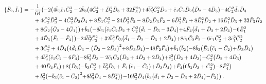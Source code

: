 \documentclass[10pt]{amsart}
\theoremstyle{definition}
\theoremstyle{corollary}
\theoremstyle{remark}
\theoremstyle{conclusion}
\begin{document}
\begin{align}
    \{\bar{F}_2, \bar{I}_1\}&=-\frac{{\rm i}}{64}  \bigl(-2 \bigl(4 \bar{b}_3 \bar{c}_1 \bar{C}_2^3-2 \bar{b}_3 \bigl(4 \bar{C}_2^4+\bar{D}_2^2 \bar{D}_3+32 \bar{F}_3^2\bigl)+4 \bar{b}_3^2 \bar{C}_2^2 \bar{D}_2+\bar{c}_1 \bar{C}_2 \bar{D}_2 \bigl(\bar{D}_2-4 \bar{D}_3\bigl)-4 \bar{C}_2^2 \bar{d}_1 \bar{D}_3\nonumber \\
& \hskip 0.7cm+4 \bar{C}_2^2 \bar{D}_3^2-4 \bar{C}_2^2 \bar{D}_2 \bar{D}_4+8 \bar{E}_1 \bar{C}_2^3-24 \bar{D}_3^2 \bar{F}_2-8 \bar{D}_2 \bar{D}_3 \bar{F}_2-6 \bar{D}_2^2 \bar{F}_4+8 \bar{E}_1^2 \bar{D}_2+16 \bar{E}_1^2 \bar{D}_3+32 \bar{F}_3 \bar{H}_2 \nonumber \\
& \hskip 0.7cm+8 \bar{G}_2 \bigl(\bar{G}_2-4 \bar{G}_1\bigl)\bigl)+\bar{b}_2 \bigl(-8 \bar{b}_3 \bigl(\bar{c}_1 \bar{C}_2 \bar{D}_2+\bar{C}_2^2 \bigl(\bar{d}_1-\bar{D}_3-3 \bar{D}_4\bigl)+4 \bar{F}_4 \bigl(\bar{d}_1+\bar{D}_2+2 \bar{D}_4\bigl)-6 \bar{E}_1^2 \nonumber \\
& \hskip 0.7cm+4 \bar{D}_3 \bigl(\bar{F}_2-\bar{F}_4\bigl)\bigl)-24 \bar{b}_3^3 \bar{C}_2^2+32 \bar{b}_3^2 \bar{D}_3 \bigl(\bar{d}_1+\bar{D}_2-\bar{D}_3+2 \bar{D}_4\bigl)+8 \bar{c}_1 \bar{C}_2 \bar{F}_2-6 \bar{c}_1 \bar{C}_2^3+3 \bar{c}_1^2 \bar{C}_2^2 \nonumber \\
& \hskip 0.7cm+3 \bar{C}_2^4+4 \bar{D}_4 \bigl(4 \bar{d}_1 \bar{D}_3-\bigl(\bar{D}_2-2 \bar{D}_3\bigl)^2+8 \bar{D}_3 \bar{D}_4\bigl)-48 \bar{F}_2 \bar{F}_4\bigl)+\bar{b}_1 \bigl(\bar{b}_2 \bigl(-8 \bar{b}_3 \bigl(\bar{E}_1 \bigl(\bar{c}_1-\bar{C}_2\bigl)+\bar{D}_3 \bar{D}_4\bigl) \nonumber \\
& \hskip 0.7cm+4 \bar{b}_3^2 \bigl(\bar{c}_1 \bar{C}_2-6 \bar{F}_4\bigl)-8 \bar{b}_3^3 \bar{D}_3-2 \bar{c}_1 \bar{C}_2 \bigl(\bar{D}_2+4 \bar{D}_3+2 \bar{D}_4\bigl)+\bar{c}_1^2 \bigl(\bar{D}_2+4 \bar{D}_3\bigl)+\bar{C}_2^2 \bigl(\bar{D}_2+4 \bar{D}_3\bigl)\nonumber \\
& \hskip 0.7cm+40 \bar{D}_4 \bar{F}_4\bigl)+8 \bigl(\bar{D}_3 \bigl(-\bar{b}_3 \bar{C}_2^2+\bar{b}_3^2 \bar{D}_3+\bar{E}_1 \bigl(\bar{c}_1-\bar{C}_2\bigl)+\bar{D}_3 \bar{D}_4\bigl)+\bar{F}_4 \bigl(6 \bar{b}_3 \bar{D}_3+\bar{C}_2^2\bigl)-8 \bar{F}_4^2\bigl)\nonumber \\
& \hskip 0.7cm+\bar{b}_2^2 \bigl(-\bar{b}_3 \bigl(\bar{c}_1-\bar{C}_2\bigl)^2+8 \bar{b}_3^2 \bar{D}_4-8 \bar{D}_4^2\bigl)\bigl)-16 \bar{b}_2^2 \bar{D}_4 \bigl(\bar{b}_3 \bigl(\bar{d}_1+\bar{D}_2-\bar{D}_3+2 \bar{D}_4\bigl)-\bar{F}_2\bigl)\bigl) \,.
\end{align}
\end{document}
